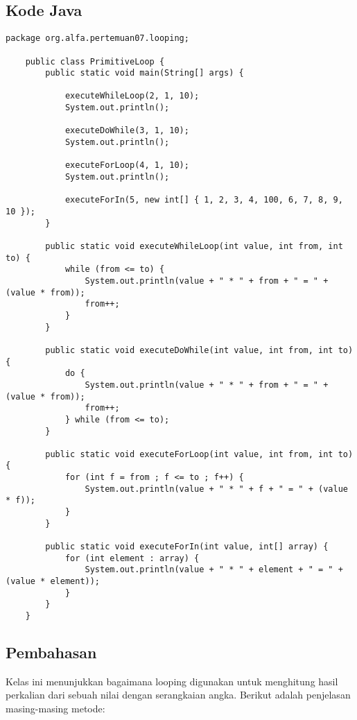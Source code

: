 \subsection{Kode Java}
\begin{lstlisting}[style=JavaStyle]
	package org.alfa.pertemuan07.looping;
	
	public class PrimitiveLoop {
		public static void main(String[] args) {
			
			executeWhileLoop(2, 1, 10);
			System.out.println();
			
			executeDoWhile(3, 1, 10);
			System.out.println();
			
			executeForLoop(4, 1, 10);
			System.out.println();
			
			executeForIn(5, new int[] { 1, 2, 3, 4, 100, 6, 7, 8, 9, 10 });
		}
		
		public static void executeWhileLoop(int value, int from, int to) {
			while (from <= to) {
				System.out.println(value + " * " + from + " = " + (value * from));
				from++;
			}
		}
		
		public static void executeDoWhile(int value, int from, int to) {
			do {
				System.out.println(value + " * " + from + " = " + (value * from));
				from++;
			} while (from <= to);
		}
		
		public static void executeForLoop(int value, int from, int to) {
			for (int f = from ; f <= to ; f++) {
				System.out.println(value + " * " + f + " = " + (value * f));
			}
		}
		
		public static void executeForIn(int value, int[] array) {
			for (int element : array) {
				System.out.println(value + " * " + element + " = " + (value * element));
			}
		}
	}
\end{lstlisting}

\subsection{Pembahasan}
Kelas ini menunjukkan bagaimana looping digunakan untuk menghitung hasil perkalian dari sebuah nilai dengan serangkaian angka. Berikut adalah penjelasan masing-masing metode:

